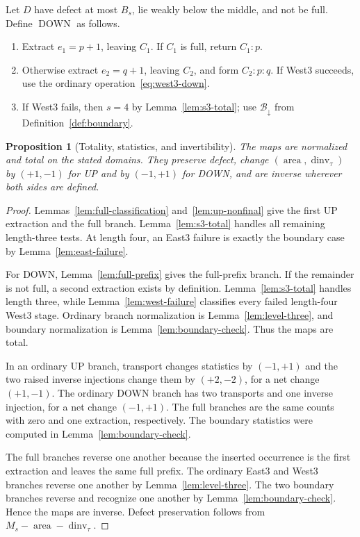 \documentclass[11pt]{article}
\newtheorem{proposition}[theorem]{Proposition}
\theoremstyle{definition}
\theoremstyle{remark}
\newcommand{\area}{\operatorname{area}}
\newcommand{\dinv}{\operatorname{dinv}}
\newcommand{\DOWN}{\operatorname{DOWN}}
\begin{document}
Let $D$ have defect at most $B_s$, lie weakly below the middle, and not be
full.  Define $\DOWN$ as follows.
\begin{enumerate}
\item Extract $e_1=p+1$, leaving $C_1$.  If $C_1$ is full, return $C_1:p$.
\item Otherwise extract $e_2=q+1$, leaving $C_2$, and form $C_2:p:q$.
If West3 succeeds, use the ordinary operation~\eqref{eq:west3-down}.
\item If West3 fails, then $s=4$ by Lemma~\ref{lem:s3-total}; use
$\mathcal B_\downarrow$ from Definition~\ref{def:boundary}.
\end{enumerate}

\begin{proposition}[Totality, statistics, and invertibility]
\label{prop:maps}
The maps are normalized and total on the stated domains.  They preserve
defect, change $(\area,\dinv_\tau)$ by $(+1,-1)$ for UP and by $(-1,+1)$
for DOWN, and are inverse wherever both sides are defined.
\end{proposition}

\begin{proof}
Lemmas~\ref{lem:full-classification} and~\ref{lem:up-nonfinal} give the
first UP extraction and the full branch.  Lemma~\ref{lem:s3-total} handles
all remaining length-three tests.  At length four, an East3 failure is
exactly the boundary case by Lemma~\ref{lem:east-failure}.

For DOWN, Lemma~\ref{lem:full-prefix} gives the full-prefix branch.  If the
remainder is not full, a second extraction exists by definition.
Lemma~\ref{lem:s3-total} handles length three, while
Lemma~\ref{lem:west-failure} classifies every failed length-four West3
stage.  Ordinary branch normalization is Lemma~\ref{lem:level-three}, and
boundary normalization is Lemma~\ref{lem:boundary-check}.  Thus the maps
are total.

In an ordinary UP branch, transport changes statistics by $(-1,+1)$ and
the two raised inverse injections change them by $(+2,-2)$, for a net
change $(+1,-1)$.  The ordinary DOWN branch has two transports and one
inverse injection, for a net change $(-1,+1)$.  The full branches are the
same counts with zero and one extraction, respectively.  The boundary
statistics were computed in Lemma~\ref{lem:boundary-check}.

The full branches reverse one another because the inserted occurrence is
the first extraction and leaves the same full prefix.  The ordinary
East3 and West3 branches reverse one another by
Lemma~\ref{lem:level-three}.  The two boundary branches reverse and
recognize one another by Lemma~\ref{lem:boundary-check}.  Hence the maps
are inverse.  Defect preservation follows from
$M_s-\area-\dinv_\tau$.
\end{proof}
\end{document}
